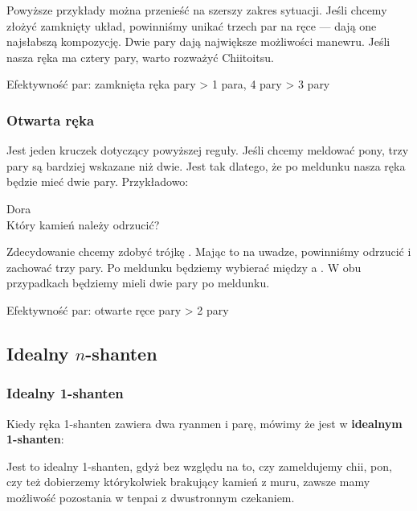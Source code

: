 \bigskip
Powyższe przykłady można przenieść na szerszy zakres sytuacji.
Jeśli chcemy złożyć zamknięty układ, powinniśmy unikać trzech par na ręce --- dają one najsłabszą kompozycję.
Dwie pary dają największe możliwości manewru.
Jeśli nasza ręka ma cztery pary, warto rozważyć {\jap Chiitoitsu}.

\bigskip

\color{MyRed}
\begin{itembox}[c]{Efektywność par: zamknięta ręka}
\centering{} pary > 1 para, 4 pary > 3 pary
\end{itembox}\normalcolor

\bigskip

\subsubsection{Otwarta ręka}

Jest jeden kruczek dotyczący powyższej reguły.
Jeśli chcemy meldować {\jap pon}y, trzy pary są bardziej wskazane niż dwie.
Jest tak dlatego, że po meldunku nasza ręka będzie mieć dwie pary.
Przykładowo:
\begin{screen}
\vspace{-15pt}\hfill{\footnotesize{\jap Dora}~~~~~~~}\\
\vspace{-2pt}Który kamień należy odrzucić?\vspace{-5pt}
\end{screen}
\noindent
Zdecydowanie chcemy zdobyć trójkę .
Mając to na uwadze, powinniśmy odrzucić  i zachować trzy pary.
Po meldunku będziemy wybierać między  a .
{}
{}
W obu przypadkach będziemy mieli dwie pary po meldunku.

\bigskip

\color{MyRed}
\begin{itembox}[c]{Efektywność par: otwarte ręce}
\centering{} pary > 2 pary
\end{itembox}\normalcolor

\bigskip

\subsection{Idealny $n$-{\jap shanten}}\label{sec:perfect}

\subsubsection{Idealny 1-{\jap shanten}}
Kiedy ręka 1-{\jap shanten} zawiera dwa {\jap ryanmen} i parę, mówimy że jest w {\bf idealnym 1-{\jap shanten}}:
\begin{screen}
\end{screen}
Jest to idealny 1-{\jap shanten}, gdyż bez względu na to, czy zameldujemy {\jap chii}, {\jap pon}, czy też dobierzemy którykolwiek brakujący kamień z muru, zawsze mamy możliwość pozostania w {\jap tenpai} z dwustronnym czekaniem.

